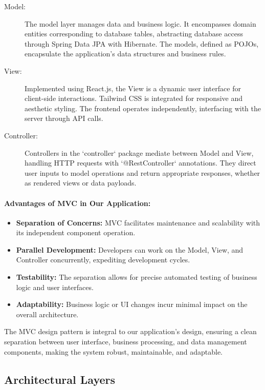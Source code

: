 \begin{description}
  \item[Model:] The model layer manages data and business logic. It encompasses domain entities corresponding to database tables, abstracting database access through Spring Data JPA with Hibernate. The models, defined as POJOs, encapsulate the application's data structures and business rules.
  
  \item[View:] Implemented using React.js, the View is a dynamic user interface for client-side interactions. Tailwind CSS is integrated for responsive and aesthetic styling. The frontend operates independently, interfacing with the server through API calls.
  
  \item[Controller:] Controllers in the `controller` package mediate between Model and View, handling HTTP requests with `@RestController` annotations. They direct user inputs to model operations and return appropriate responses, whether as rendered views or data payloads.
\end{description}
\cite{sandeshMVC2018}

\paragraph{Advantages of MVC in Our Application:}
\begin{itemize}
  \item \textbf{Separation of Concerns:} MVC facilitates maintenance and scalability with its independent component operation.
  \item \textbf{Parallel Development:} Developers can work on the Model, View, and Controller concurrently, expediting development cycles.
  \item \textbf{Testability:} The separation allows for precise automated testing of business logic and user interfaces.
  \item \textbf{Adaptability:} Business logic or UI changes incur minimal impact on the overall architecture.
\end{itemize}

The MVC design pattern is integral to our application's design, ensuring a clean separation between user interface, business processing, and data management components, making the system robust, maintainable, and adaptable.


\subsection{Architectural Layers}
